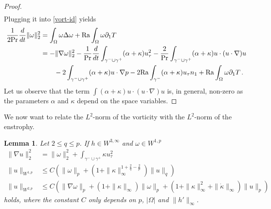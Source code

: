 \documentclass{article}
\newtheorem{lemma}[theorem]{Lemma}
\theoremstyle{definition}
\theoremstyle{definition}
\newcommand{\Pra}{\rm{Pr}}
\newcommand{\Ra}{{\rm{Ra}}}
\begin{document}
\begin{proof}
\begin{align*}
\end{align*}
Plugging it into \eqref{vort-id} yields
\begin{align*}
    \frac{1}{2\Pra}\frac{d}{dt}\|\omega\|_2^2
    &=\int_{\Omega} \omega\Delta\omega +\Ra\int_{\Omega} \omega \partial_1 T
    \\
    &=-\|\nabla \omega\|_2^2 -\frac{1}{\Pra}\frac{d}{dt}\int_{\gamma^-\cup\gamma^+} (\alpha+\kappa)u_\tau^2 - \frac{2}{\Pra}\int_{\gamma^-\cup\gamma^+} (\alpha+\kappa) u\cdot (u\cdot\nabla) u 
    \\
    &\qquad -2 \int_{\gamma^-\cup\gamma^+} (\alpha+\kappa) u \cdot \nabla p -2 \Ra\int_{\gamma^-} (\alpha+\kappa)u_\tau n_1 +\Ra\int_{\Omega} \omega \partial_1 T\,.
\end{align*}
Let us observe that the term $\int(\alpha+\kappa) u\cdot (u\cdot\nabla) u$ is, in general, non-zero as the parameters $\alpha$ and $\kappa$ depend on the space variables.
\end{proof}

We now want to relate the $L^2$-norm of the vorticity with the $L^2$-norm of the enstrophy.


\begin{lemma}
\label{lemma_u_bounded_by_omega}
Let $2\leq q \leq p$. If $h\in W^{3,\infty}$ and $\omega\in W^{1,p}$
\begin{equation*}
    \begin{aligned}
        \|\nabla u\|_2^2 &= \|\omega\|_2^2 + \int_{\gamma^-\cup\gamma^+} \kappa u_\tau^2
        \\
        \| u \|_{W^{1,p}} &\leq C \left(\|\omega\|_p + \left(1+\|\kappa\|_\infty^{1+\frac{2}{q}-\frac{2}{p}}\right)\|u\|_q\right)
        \\
        \| u \|_{W^{2,p}} &\leq C \left(\|\nabla \omega\|_p + (1+\|\kappa\|_\infty)\| \omega\|_p +\left(1+\|\kappa\|_\infty^2 + \|\dot\kappa\|_\infty\right)\|u\|_p\right)
    \end{aligned}
\end{equation*}
holds, where the constant $C$ only depends on $p$, $|\Omega|$ and $\|h'\|_{\infty}$.
\end{lemma}
\end{document}

